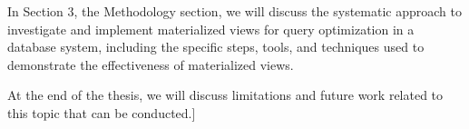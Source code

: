 In Section 3, the Methodology section, we will discuss the systematic approach to investigate and implement materialized views for query optimization in a database system, including the specific steps, tools, and techniques used to demonstrate the effectiveness of materialized views.\vspace{.4cm}

At the end of the thesis, we will discuss limitations and future work related to this topic that can be conducted.]











